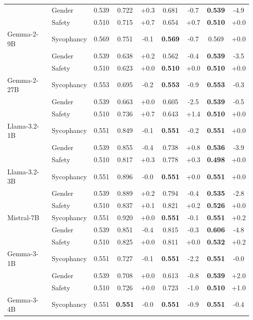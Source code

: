 \begin{table}[t]
\begin{tabular}{l l c | c c | c c | c c}
 & Gender & 0.539 & 0.722 & +0.3 & 0.681 & -0.7 & \textbf{0.539} & -4.9 \\
 & Safety & 0.510 & 0.715 & +0.7 & 0.654 & +0.7 & \textbf{0.510} & +0.0 \\
\addlinespace[2pt]
Gemma-2-9B & Sycophancy & 0.569 & 0.751 & -0.1 & \textbf{0.569} & -0.7 & 0.569 & +0.0 \\
 & Gender & 0.539 & 0.638 & +0.2 & 0.562 & -0.4 & \textbf{0.539} & -3.5 \\
 & Safety & 0.510 & 0.623 & +0.0 & \textbf{0.510} & +0.0 & \textbf{0.510} & +0.0 \\
\addlinespace[2pt]
Gemma-2-27B & Sycophancy & 0.553 & 0.695 & -0.2 & \textbf{0.553} & -0.9 & \textbf{0.553} & -0.3 \\
 & Gender & 0.539 & 0.663 & +0.0 & 0.605 & -2.5 & \textbf{0.539} & -0.5 \\
 & Safety & 0.510 & 0.736 & +0.7 & 0.643 & +1.4 & \textbf{0.510} & +0.0 \\
\addlinespace[2pt]
Llama-3.2-1B & Sycophancy & 0.551 & 0.849 & -0.1 & \textbf{0.551} & -0.2 & \textbf{0.551} & +0.0 \\
 & Gender & 0.539 & 0.855 & -0.4 & 0.738 & +0.8 & \textbf{0.536} & -3.9 \\
 & Safety & 0.510 & 0.817 & +0.3 & 0.778 & +0.3 & \textbf{0.498} & +0.0 \\
\addlinespace[2pt]
Llama-3.2-3B & Sycophancy & 0.551 & 0.896 & -0.0 & \textbf{0.551} & +0.0 & \textbf{0.551} & +0.0 \\
 & Gender & 0.539 & 0.889 & +0.2 & 0.794 & -0.4 & \textbf{0.535} & -2.8 \\
 & Safety & 0.510 & 0.837 & +0.1 & 0.821 & +0.2 & \textbf{0.526} & +0.0 \\
\addlinespace[2pt]
Mistral-7B & Sycophancy & 0.551 & 0.920 & +0.0 & \textbf{0.551} & -0.1 & \textbf{0.551} & +0.2 \\
 & Gender & 0.539 & 0.851 & -0.4 & 0.815 & -0.3 & \textbf{0.606} & -4.8 \\
 & Safety & 0.510 & 0.825 & +0.0 & 0.811 & +0.0 & \textbf{0.532} & +0.2 \\
\addlinespace[2pt]
Gemma-3-1B & Sycophancy & 0.551 & 0.727 & -0.1 & \textbf{0.551} & -2.2 & \textbf{0.551} & -0.0 \\
 & Gender & 0.539 & 0.708 & +0.0 & 0.613 & -0.8 & \textbf{0.539} & +2.0 \\
 & Safety & 0.510 & 0.726 & +0.0 & 0.723 & -1.0 & \textbf{0.510} & +1.0 \\
\addlinespace[2pt]
Gemma-3-4B & Sycophancy & 0.551 & \textbf{0.551} & -0.0 & \textbf{0.551} & -0.9 & \textbf{0.551} & -0.4 \\

\end{tabular}
\end{table}
